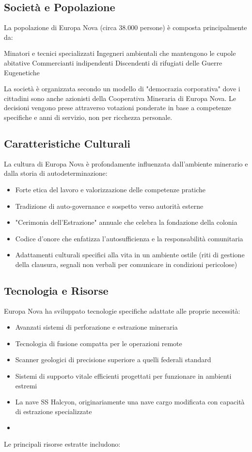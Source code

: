 \documentclass[letterpaper,twocolumn,openany,nodeprecatedcode]{dndbook}
\begin{document}
\subsection{Società e Popolazione}
La popolazione di Europa Nova (circa 38.000 persone) è composta principalmente da:

Minatori e tecnici specializzati
Ingegneri ambientali che mantengono le cupole abitative
Commercianti indipendenti
Discendenti di rifugiati delle Guerre Eugenetiche

La società è organizzata secondo un modello di "democrazia corporativa" dove i cittadini sono anche azionisti della Cooperativa Mineraria di Europa Nova. Le decisioni vengono prese attraverso votazioni ponderate in base a competenze specifiche e anni di servizio, non per ricchezza personale.
\subsection{Caratteristiche Culturali}
La cultura di Europa Nova è profondamente influenzata dall'ambiente minerario e dalla storia di autodeterminazione:

\begin{itemize}
    \item Forte etica del lavoro e valorizzazione delle competenze pratiche
    \item Tradizione di auto-governance e sospetto verso autorità esterne
    \item "Cerimonia dell'Estrazione" annuale che celebra la fondazione della colonia
    \item Codice d'onore che enfatizza l'autosufficienza e la responsabilità comunitaria
    \item Adattamenti culturali specifici alla vita in un ambiente ostile (riti di gestione della clausura, segnali non verbali per comunicare in condizioni pericolose)
\end{itemize}

\subsection{Tecnologia e Risorse}
Europa Nova ha sviluppato tecnologie specifiche adattate alle proprie necessità:

\begin{itemize}
    \item Avanzati sistemi di perforazione e estrazione mineraria
    \item Tecnologia di fusione compatta per le operazioni remote
    \item Scanner geologici di precisione superiore a quelli federali standard
    \item Sistemi di supporto vitale efficienti progettati per funzionare in ambienti estremi
    \item La nave SS Halcyon, originariamente una nave cargo modificata con capacità di estrazione specializzate
    \item 
\end{itemize}
Le principali risorse estratte includono:
\end{document}
